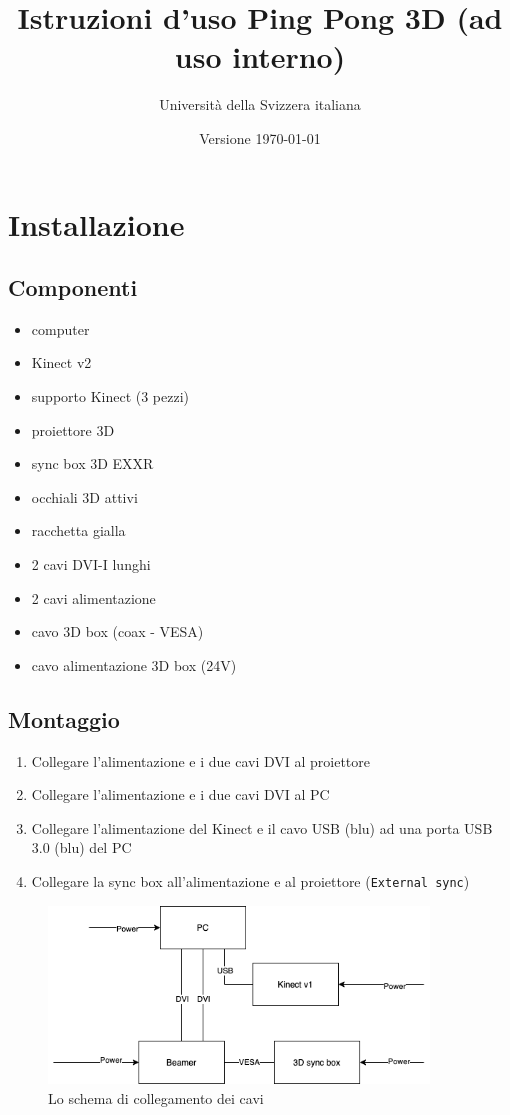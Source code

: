 \documentclass[12pt]{article}
\title{Istruzioni d'uso Ping Pong 3D (ad uso interno)}
\author{Università della Svizzera italiana}
\date{Versione \today}
\begin{document}
\maketitle
\tableofcontents
\newpage


\section{Installazione}\label{installation}	

	\subsection{Componenti}
	
		\begin{itemize}
			\item computer
			\item Kinect v2
			\item supporto Kinect (3 pezzi)
			\item proiettore 3D
			\item sync box 3D EXXR
			\item occhiali 3D attivi
			\item racchetta gialla
			\item 2 cavi DVI-I lunghi
			\item 2 cavi alimentazione
			\item cavo 3D box (coax - VESA)
			\item cavo alimentazione 3D box (24V)
		\end{itemize}
		
		
	\subsection{Montaggio}
	
		\begin{enumerate}
			\item Collegare l'alimentazione e i due cavi DVI al proiettore
			\item Collegare l'alimentazione e i due cavi DVI al PC
			\item Collegare l'alimentazione del Kinect e il cavo USB (blu) ad una porta USB 3.0 (blu) del PC
			\item Collegare la sync box all'alimentazione e al proiettore (\texttt{External sync})
		\end{enumerate}

		\begin{figure}[H]
			\centering
			\includegraphics[width=0.9\textwidth]{img/cablesScheme.png}
			\caption*{Lo schema di collegamento dei cavi}
		\end{figure}
		
\end{document}
